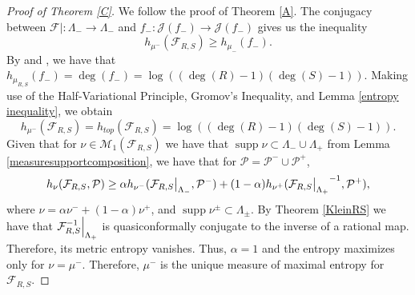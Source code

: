 \documentclass[11pt,letterpaper]{article}
\theoremstyle{definition}
\def\supp{\operatorname{supp}}
\newcommand\restr[2]{{%
  \left.\kern-\nulldelimiterspace %
  #1 %
  \vphantom{\big|} %
  \right|_{#2} %
  }}
\begin{document}
\begin{proof}[Proof of Theorem \ref{C}]
We follow the proof of Theorem \ref{A}. The conjugacy between $\mathcal{F}|:\Lambda_-\to\Lambda_-$ and $f_-:\mathcal{J}(f_-)\to\mathcal{J}(f_-)$ gives us the inequality 
$$h_{\mu^-}(\mathcal{F}_{R,S})\geq h_{\mu_-}(f_-).$$
By \cite{FreLopMan83} and \cite{Lju83}, we have that $h_{\mu_{R,S}}(f_-)=\deg(f_-)=\log((\deg(R)-1)(\deg(S)-1))$. Making use of the Half-Variational Principle, Gromov's Inequality, and Lemma \ref{entropy inequality}, we obtain
$$h_{\mu^-}(\mathcal{F}_{R,S})=h_{top}(\mathcal{F}_{R,S})=\log((\deg(R)-1)(\deg(S)-1)).$$
Given that for $\nu\in\mathcal{M}_1(\mathcal{F}_{R,S})$ we have that $\supp\nu\subset\Lambda_-\cup\Lambda_+$ from Lemma \ref{measuresupportcomposition}, we have that for $\mathcal{P}=\mathcal{P}^-\cup\mathcal{P}^+$,
$$h_{\nu}(\mathcal{F}_{R,S},\mathcal{P})\geq\alpha h_{\nu^-}(\restr{\mathcal{F}_{R,S}}{\Lambda_-},\mathcal{P}^-)+(1-\alpha) h_{\nu^+}(\restr{\mathcal{F}_{R,S}}{\Lambda_+}^{-1},\mathcal{P}^+),$$
where $\nu=\alpha\nu^-+(1-\alpha)\nu^+$, and $\supp\nu^{\pm}\subset\Lambda_{\pm}$. By Theorem \ref{KleinRS} we have that $\restr{\mathcal{F}_{R,S}^{-1}}{\Lambda_+}$ is quasiconformally conjugate to the inverse of a rational map. Therefore, its metric entropy vanishes. Thus, $\alpha=1$ and the entropy maximizes only for $\nu=\mu^-$. Therefore, $\mu^-$ is the unique measure of maximal entropy for $\mathcal{F}_{R,S}$.
\end{proof}



\end{document}
